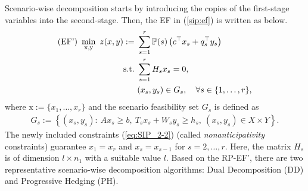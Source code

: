 Scenario-wise decomposition starts by introducing the copies of the first-stage variables into the second-stage. Then, the EF in (\ref{sip:ef}) is written as below.
\begin{subequations} \label{sip:ef'}
	\begin{align}
	\textrm{(EF') }\min_{\mathrm{x},\mathrm{y}}\ z(x,y):=\ &\sum_{s=1}^{r}\PP(s)\left(c^{\top}x_s+q_s^{\top}y_s\right)	\label{eq:SIP_2-1}\\ 
	\mathrm{s.t.}\ &\sum_{s=1}^{r}H_s x_s=0, \label{eq:SIP_2-2} \\
	\ &(x_s,y_s)\in G_s,\quad \forall s\in\{1,\ldots,r\},	\label{eq:SIP_2-3}
	\end{align}
\end{subequations}
where $\mathrm{x}:=\{x_1,\ldots,x_r\}$ and the scenario feasibility set $G_s$ is defined as
\begin{align} 
G_s:=\left\{ (x_s,y_s): \ Ax_s\ge b,\  T_s x_s+W_s y_s\ge h_s,\ (x_s,y_s)\in X\times Y  \right\}. \label{eq:SIP_2-4}
\end{align}
The newly included constraints (\ref{eq:SIP_2-2}) (called \textit{nonanticipativity} constraints) guarantee $x_1=x_r$ and $x_s=x_{s-1}$ for $s=2,\ldots,r$. Here, the matrix $H_s$ is of dimension $l\times n_1$ with a suitable value $l$. %
Based on the RP-EF', there are two representative scenario-wise decomposition algorithms: Dual Decomposition (DD) and Progressive Hedging (PH). 


